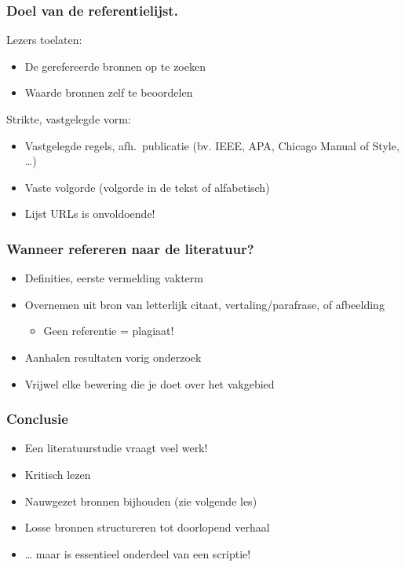 \documentclass[aspectratio=169]{beamer}
\begin{document}
\begin{frame}[plain]
  \frametitle{Doel van de referentielijst.}

  Lezers toelaten:

  \begin{itemize}
    \item De gerefereerde bronnen op te zoeken
    \item Waarde bronnen zelf te beoordelen
  \end{itemize}

  {\pause}

  Strikte, vastgelegde vorm:

  \begin{itemize}
    \item Vastgelegde regels, afh.~publicatie (bv. IEEE, APA, Chicago Manual of Style, \ldots)
    \item Vaste volgorde (volgorde in de tekst of alfabetisch)
    \item Lijst URLs is onvoldoende!
  \end{itemize}

  {\pause}

\end{frame}

\begin{frame}
  \frametitle{Wanneer refereren naar de literatuur?}

  \begin{itemize}
    \item Definities, eerste vermelding vakterm
    \item Overnemen uit bron van letterlijk citaat, vertaling/parafrase, of afbeelding
    \begin{itemize}
      \item Geen referentie = \alert{plagiaat!}
    \end{itemize}
    \item Aanhalen resultaten vorig onderzoek
    \item Vrijwel elke bewering die je doet over het vakgebied
  \end{itemize}

  \bigskip

\end{frame}

\begin{frame}
  \frametitle{Conclusie}

  \begin{itemize}
    \item Een literatuurstudie vraagt veel werk!
    \item Kritisch lezen
    \item Nauwgezet bronnen bijhouden (zie volgende les)
    \item Losse bronnen structureren tot doorlopend verhaal
    \item \ldots{} maar is essentieel onderdeel van een scriptie!
  \end{itemize}

\end{frame}
\end{document}
